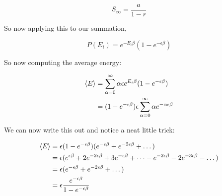 \documentclass{article}
\begin{document}
\begin{enumerate}[(a)]
\begin{solution}
            \[ S_\infty = \frac{a}{1-r}\]

            So now applying this to our summation, 

            \[ P(E_i) = e^{-E_i\beta}(1-e^{-\epsilon \beta})\]

            So now computing the average energy:

            \begin{align*}
                \langle E \rangle &= \sum_{\alpha = 0}^\infty \alpha \epsilon e^{E_i\beta}(1 - e^{-\epsilon \beta})\\
                &= (1 - e^{-\epsilon \beta})\epsilon \sum_{\alpha = 0}^\infty \alpha e^{-\alpha \epsilon \beta}\\
            \end{align*}

            We can now write this out and notice a neat little trick:


            \begin{align*}
                \langle E \rangle &= \epsilon (1 - e^{-\epsilon \beta})(e^{-\epsilon \beta} + e^{-2\epsilon \beta} + \dots)\\
                &= \epsilon(e^{\epsilon \beta} + 2e^{-2\epsilon \beta} + 3e^{-\epsilon \beta} + \dots - e^{-2\epsilon \beta} - 2e^{-3\epsilon \beta} - \dots)\\
                &= \epsilon (e^{-\epsilon \beta} + e^{-2\epsilon \beta} + \dots)\\
                &= \epsilon \frac{e^{-\epsilon \beta}}{1 - e^{-\epsilon \beta}}
            \end{align*}






        \end{solution}
    \end{enumerate}


    \pagebreak
\end{document}
